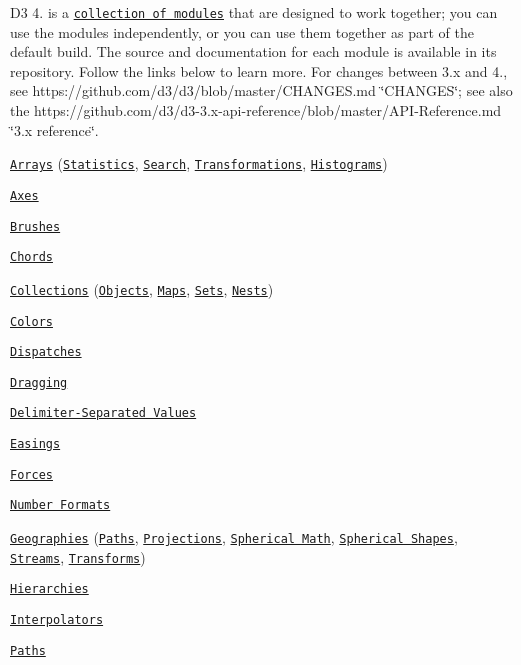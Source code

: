 D3 4. is a \href{https://github.com/d3}{\tt collection of modules} that are designed to work together; you can use the modules independently, or you can use them together as part of the default build. The source and documentation for each module is available in its repository. Follow the links below to learn more. For changes between 3.\+x and 4., see https\+://github.com/d3/d3/blob/master/\+C\+H\+A\+N\+G\+E\+S.\+md \char`\"{}\+C\+H\+A\+N\+G\+E\+S\char`\"{}; see also the https\+://github.com/d3/d3-\/3.\+x-\/api-\/reference/blob/master/\+A\+P\+I-\/\+Reference.\+md \char`\"{}3.\+x reference\char`\"{}.


\begin{DoxyItemize}
\item \href{#arrays-d3-array}{\tt Arrays} (\href{#statistics}{\tt Statistics}, \href{#search}{\tt Search}, \href{#transformations}{\tt Transformations}, \href{#histograms}{\tt Histograms})
\item \href{#axes-d3-axis}{\tt Axes}
\item \href{#brushes-d3-brush}{\tt Brushes}
\item \href{#chords-d3-chord}{\tt Chords}
\item \href{#collections-d3-collection}{\tt Collections} (\href{#objects}{\tt Objects}, \href{#maps}{\tt Maps}, \href{#sets}{\tt Sets}, \href{#nests}{\tt Nests})
\item \href{#colors-d3-color}{\tt Colors}
\item \href{#dispatches-d3-dispatch}{\tt Dispatches}
\item \href{#dragging-d3-drag}{\tt Dragging}
\item \href{#delimiter-separated-values-d3-dsv}{\tt Delimiter-\/\+Separated Values}
\item \href{#easings-d3-ease}{\tt Easings}
\item \href{#forces-d3-force}{\tt Forces}
\item \href{#number-formats-d3-format}{\tt Number Formats}
\item \href{#geographies-d3-geo}{\tt Geographies} (\href{#paths}{\tt Paths}, \href{#projections}{\tt Projections}, \href{#spherical-math}{\tt Spherical Math}, \href{#spherical-shapes}{\tt Spherical Shapes}, \href{#streams}{\tt Streams}, \href{#transforms}{\tt Transforms})
\item \href{#hierarchies-d3-hierarchy}{\tt Hierarchies}
\item \href{#interpolators-d3-interpolate}{\tt Interpolators}
\item \href{#paths-d3-path}{\tt Paths}

\end{DoxyItemize}
